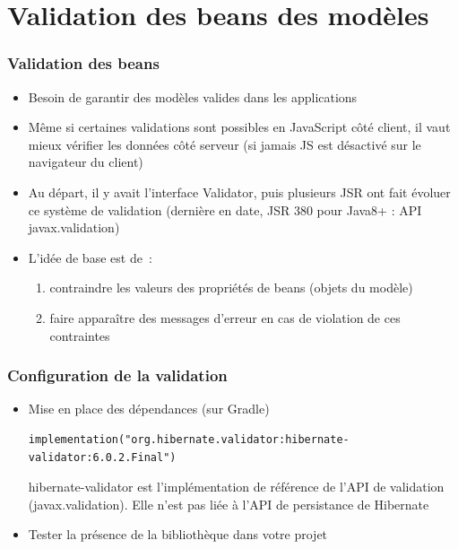 \documentclass{beamer}
\begin{document}
\section{Validation des beans des modèles}

\begin{frame}
	\frametitle{Validation des beans}
	\begin{itemize}
		\item Besoin de garantir des modèles valides dans les applications
		\item Même si certaines validations sont possibles en JavaScript côté client, il vaut mieux vérifier les données côté serveur (si jamais JS est désactivé sur le navigateur du client)
		\item Au départ, il y avait l'interface Validator, puis plusieurs JSR ont fait évoluer ce système de validation (dernière en date, JSR 380 pour Java8+ : API javax.validation)
		\item L'idée de base est de~:
		\begin{enumerate}
			\item contraindre les valeurs des propriétés de beans (objets du modèle)
			\item faire apparaître des messages d'erreur en cas de violation de ces contraintes 
		\end{enumerate}
	\end{itemize}
\end{frame} 

\begin{frame}[fragile]
	\frametitle{Configuration de la validation}
	\begin{itemize}
		\item Mise en place des dépendances (sur Gradle)
\begin{lstlisting}
implementation("org.hibernate.validator:hibernate-validator:6.0.2.Final")
\end{lstlisting}
		hibernate-validator est l'implémentation de référence de l'API de validation (javax.validation). Elle n'est pas liée à l'API de persistance de Hibernate
		\item Tester la présence de la bibliothèque dans votre projet
	\end{itemize}
\end{frame} 
\end{document}
